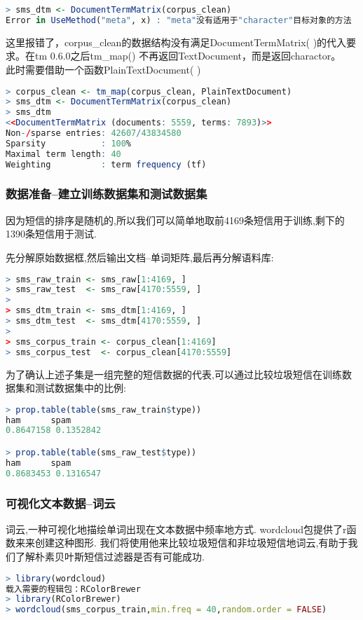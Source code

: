 \documentclass[11pt,a4paper,oneside]{book}
\begin{document}
\begin{lstlisting}[language=r]
> sms_dtm <- DocumentTermMatrix(corpus_clean)
Error in UseMethod("meta", x) : "meta"没有适用于"character"目标对象的方法
\end{lstlisting}
\begin{tcolorbox}[colback=pink!10!white,colframe=pink!100!black]
这里报错了，corpus\_clean的数据结构没有满足DocumentTermMatrix( )的代入要求。在tm 0.6.0之后tm\_map() 不再返回TextDocument，而是返回charactor。\\

此时需要借助一个函数PlainTextDocument( )
\end{tcolorbox}
\begin{lstlisting}[language=r]
> corpus_clean <- tm_map(corpus_clean, PlainTextDocument)
> sms_dtm <- DocumentTermMatrix(corpus_clean)
> sms_dtm
<<DocumentTermMatrix (documents: 5559, terms: 7893)>>
Non-/sparse entries: 42607/43834580
Sparsity           : 100%
Maximal term length: 40
Weighting          : term frequency (tf)
\end{lstlisting}
\subsubsection{数据准备--建立训练数据集和测试数据集}
因为短信的排序是随机的,所以我们可以简单地取前4169条短信用于训练,剩下的1390条短信用于测试.

先分解原始数据框,然后输出文档--单词矩阵,最后再分解语料库:
\begin{lstlisting}[language=r]
> sms_raw_train <- sms_raw[1:4169, ]
> sms_raw_test  <- sms_raw[4170:5559, ]
> 
> sms_dtm_train <- sms_dtm[1:4169, ]
> sms_dtm_test  <- sms_dtm[4170:5559, ]
> 
> sms_corpus_train <- corpus_clean[1:4169]
> sms_corpus_test  <- corpus_clean[4170:5559]
\end{lstlisting}

为了确认上述子集是一组完整的短信数据的代表,可以通过比较垃圾短信在训练数据集和测试数据集中的比例:
\begin{lstlisting}[language=r]
> prop.table(table(sms_raw_train$type))
ham      spam 
0.8647158 0.1352842 

> prop.table(table(sms_raw_test$type))
ham      spam 
0.8683453 0.1316547 
\end{lstlisting}
\subsubsection{可视化文本数据--词云}
词云,一种可视化地描绘单词出现在文本数据中频率地方式. wordcloud包提供了r函数来来创建这种图形. 我们将使用他来比较垃圾短信和非垃圾短信地词云,有助于我们了解朴素贝叶斯短信过滤器是否有可能成功.
\begin{lstlisting}[language=r]
> library(wordcloud)
载入需要的程辑包：RColorBrewer
> library(RColorBrewer)
> wordcloud(sms_corpus_train,min.freq = 40,random.order = FALSE)
\end{lstlisting}
\end{document}
